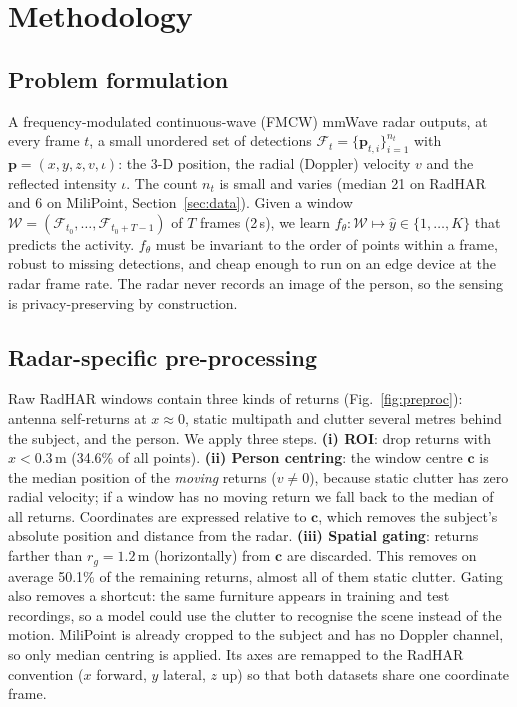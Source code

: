 \section{Methodology}
\label{sec:method}

\subsection{Problem formulation}
A frequency-modulated continuous-wave (FMCW) mmWave radar outputs, at every
frame $t$, a small unordered set of detections
$\mathcal{F}_t=\{\mathbf{p}_{t,i}\}_{i=1}^{n_t}$ with
$\mathbf{p}=(x,y,z,v,\iota)$: the 3-D position, the radial (Doppler) velocity $v$
and the reflected intensity $\iota$. The count $n_t$ is small and varies
(median 21 on RadHAR and 6 on MiliPoint, Section~\ref{sec:data}). Given a
window $\mathcal{W}=(\mathcal{F}_{t_0},\dots,\mathcal{F}_{t_0+T-1})$ of $T$ frames
(2\,s), we learn $f_\theta:\mathcal{W}\mapsto\hat{y}\in\{1,\dots,K\}$ that
predicts the activity. $f_\theta$ must be invariant to the order of points within
a frame, robust to missing detections, and cheap enough to run on an edge device
at the radar frame rate. The radar never records an image of the person, so the
sensing is privacy-preserving by construction.

\subsection{Radar-specific pre-processing}
\label{sec:preproc}
Raw RadHAR windows contain three kinds of returns (Fig.~\ref{fig:preproc}):
antenna self-returns at $x\approx0$, static multipath and clutter several metres
behind the subject, and the person. We apply three steps.
\textbf{(i) ROI}: drop returns with $x<0.3$\,m (34.6\% of all points).
\textbf{(ii) Person centring}: the window centre $\mathbf{c}$ is the median
position of the \emph{moving} returns ($v\neq0$), because static clutter has
zero radial velocity; if a window has no moving return we fall back to the median of
all returns. Coordinates are expressed relative to $\mathbf{c}$, which removes
the subject's absolute position and distance from the radar.
\textbf{(iii) Spatial gating}: returns farther than $r_g=1.2$\,m (horizontally)
from $\mathbf{c}$ are discarded. This removes on average 50.1\% of the remaining
returns, almost all of them static clutter. Gating also removes a shortcut: the
same furniture appears in training and test recordings, so a model could use
the clutter to recognise the scene instead of the motion.
MiliPoint is already cropped to the subject and has no Doppler channel, so only
median centring is applied. Its axes are remapped to the RadHAR convention ($x$
forward, $y$ lateral, $z$ up) so that both datasets share one coordinate frame.

